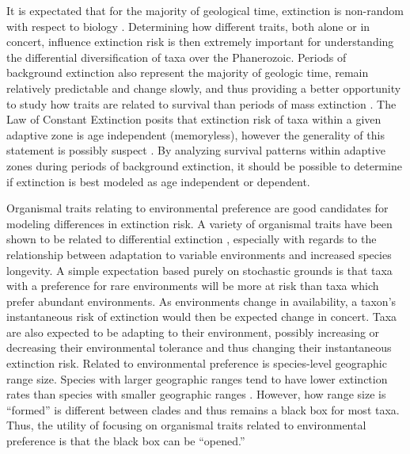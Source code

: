 \documentclass[12pt,letterpaper]{article}
\begin{document}
It is expectated that for the majority of geological time, extinction is non-random with respect to biology \citep{Jablonski1986}. Determining how different traits, both alone or in concert, influence extinction risk is then extremely important for understanding the differential diversification of taxa over the Phanerozoic. Periods of background extinction also represent the majority of geologic time, remain relatively predictable and change slowly, and thus providing a better opportunity to study how traits are related to survival than periods of mass extinction \citep{Jablonski1986,Raup1988}. The Law of Constant Extinction \citep{VanValen1973} posits that extinction risk of taxa within a given adaptive zone is age independent (memoryless), however the generality of this statement is possibly suspect \citep{Drake2014,Raup1975,Sepkoski1975,Finnegan2008}. By analyzing survival patterns within adaptive zones during periods of background extinction, it should be possible to determine if extinction is best modeled as age independent or dependent.

Organismal traits relating to environmental preference are good candidates for modeling differences in extinction risk. A variety of organismal traits have been shown to be related to differential extinction \citep{Foote2013,Liow2007b,Baumiller1993,Nurnberg2013a}, especially with regards to the relationship between adaptation to variable environments and increased species longevity. A simple expectation based purely on stochastic grounds is that taxa with a preference for rare environments will be more at risk than taxa which prefer abundant environments. As environments change in availability, a taxon's instantaneous risk of extinction would then be expected change in concert. Taxa are also expected to be adapting to their environment, possibly increasing or decreasing their environmental tolerance and thus changing their instantaneous extinction risk. Related to environmental preference is species-level geographic range size. Species with larger geographic ranges tend to have lower extinction rates than species with smaller geographic ranges \citep{Jablonski1986,Harnik2013,Nurnberg2013a,Jablonski2003,Roy2009c}. However, how range size is ``formed'' is different between clades \citep{Jablonski1987} and thus remains a black box for most taxa. Thus, the utility of focusing on organismal traits related to environmental preference is that the black box can be ``opened.''
\end{document}
